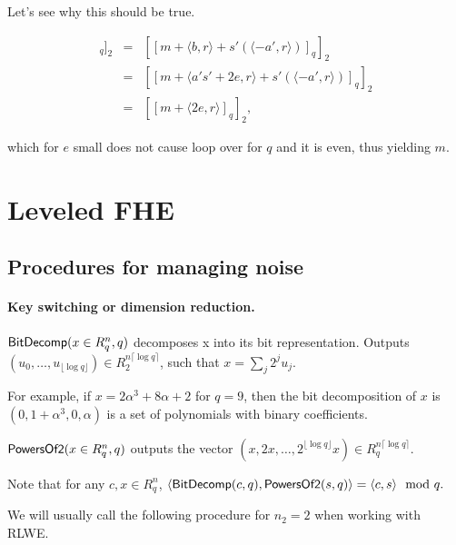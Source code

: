 \documentclass[11pt]{article}
\begin{document}

Let's see why this should be true.

\begin{eqnarray*}
[[\langle c, s \rangle]_q]_2 &=& [[m + \langle b, r \rangle + s'(\langle -a', r \rangle) ]_q]_2 \\
&=& [[m + \langle a's'+2e, r \rangle + s'(\langle -a', r \rangle) ]_q]_2  \\
&=& [[m + \langle 2e, r \rangle ]_q]_2,
\end{eqnarray*}

which for $e$ small does not cause loop over for $q$ and it is even, thus yielding $m$.


\section{Leveled FHE}


\subsection{Procedures for managing noise}

\paragraph{Key switching or dimension reduction.}
$\mathsf{BitDecomp}(x \in R^n_q, q)$ decomposes x into its bit representation. Outputs $(u_0, \dots, u_{\lfloor \log q \rfloor}) \in R_2^{n\lceil \log q \rceil }$, such that $x = \sum_j 2^j u_j$.

For example, if $x = 2 \alpha^3 + 8 \alpha + 2$ for $q = 9$, then the bit decomposition of $x$ is $(0, 1+\alpha^3, 0, \alpha)$ is a set of polynomials with binary coefficients.

$\mathsf{PowersOf2}(x \in R^n_q, q)$ outputs the vector $(x, 2x, \dots, 2^{\lfloor \log q \rfloor} x) \in R_q^{n \lceil \log q \rceil }$.

Note that for any $c, x \in R^n_q$, $\langle \mathsf{BitDecomp}(c, q), \mathsf{PowersOf2}(s, q)\rangle = \langle c, s \rangle \mod q. $

We will usually call the following procedure for $n_2 =2$ when working with RLWE.

\end{document}
